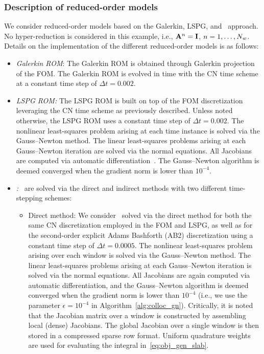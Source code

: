 \subsubsection{Description of reduced-order models}
We consider reduced-order models based on the Galerkin, LSPG, and \methodAcronym\ approach. No hyper-reduction is considered 
in this example, i.e., $\mathbf{A}^{n} = \mathbf{I}$, $n=1,\ldots,N_w$. Details on the implementation of the 
different reduced-order models is as follows:
\begin{itemize}
\item \textit{Galerkin ROM}: The Galerkin ROM is obtained through Galerkin projection of the FOM. The Galerkin ROM is evolved in time with the CN time scheme at 
a constant time step of $ \Delta t = 0.002$.

\item \textit{LSPG ROM:} The LSPG ROM is built on top of the FOM discretization leveraging the CN time scheme as previously described. Unless noted otherwise, the LSPG ROM uses a constant time step of $\Delta t = 0.002$. The nonlinear least-squares problem arising at each time instance is solved via the Gauss--Newton method. The linear least-squares problems arising at each Gauss--Newton iteration are solved via the normal equations. All Jacobians are computed via automatic differentiation~\cite{adolc}. The Gauss--Newton algorithm is deemed converged when the gradient norm is lower than $10^{-4}$. 
\item \textit{\methodAcronymROM:} \methodAcronymROMs\ are solved via the direct and indirect methods with two different time-stepping schemes: 
\begin{itemize}
\item Direct method: We consider \methodAcronymROMs\ solved via the direct method for both the same CN discretization employed in the FOM and LSPG, as well as for the second-order explicit Adams Bashforth (AB2) discretization using a constant time step of $\Delta t = 0.0005$. The nonlinear least-squares problem 
arising over each window is solved via the Gauss--Newton method. The linear least-squares problems arising at each Gauss--Newton iteration is solved via the normal equations. All Jacobians are again computed via automatic differentiation, and the Gauss--Newton algorithm is deemed converged when the gradient norm is lower than $10^{-4}$ (i.e., we use the parameter $\epsilon = 10^{-4}$ in Algorithm~\ref{alg:colloc_gn}). Critically, it is noted that the Jacobian 
matrix over a window is constructed by assembling local (dense) Jacobians. The global Jacobian over a single window is then stored in a compressed sparse row format. Uniform quadrature weights are used for evaluating the integral in~\eqref{eq:obj_gen_slab}. 


\end{itemize}
\end{itemize}
